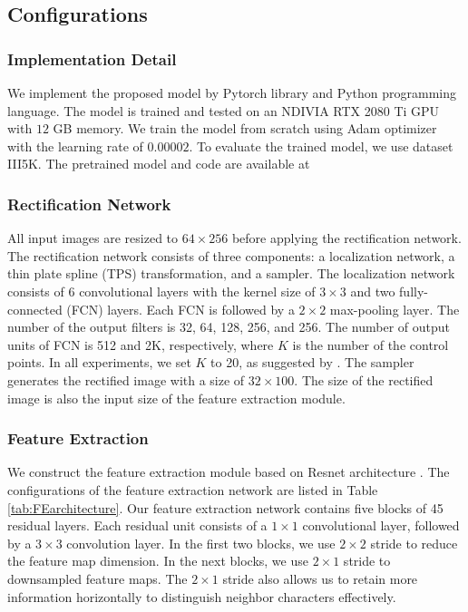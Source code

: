 \subsection{Configurations}
\subsubsection{Implementation Detail}
We implement the proposed model by Pytorch library and Python programming language. The model is trained and tested on an NDIVIA RTX 2080 Ti GPU with $12$ GB memory. We train the model from scratch using Adam optimizer with the learning rate of $0.00002$. To evaluate the trained model, we use dataset III5K. The pretrained model and code are available at \cite{sourcecode}

\subsubsection{Rectification Network} 
All input images are resized to $64 \times 256$ before applying the rectification network. The rectification network consists of three components: a localization network, a thin plate spline (TPS) transformation,  and a sampler. The localization network consists of 6 convolutional layers with the kernel size of $3 \times 3$ and two fully-connected (FCN) layers. Each FCN is followed by a $2 \times 2$ max-pooling layer. The number of the output filters is 32, 64, 128, 256, and 256. The number of output units of FCN is 512 and 2K, respectively, where $K$ is the number of the control points. In all experiments, we set $K$ to 20, as suggested by \cite{shi2018aster}. The sampler generates the rectified image with a size of $32 \times 100$. The size of the rectified image is also the input size of the feature extraction module. 

\subsubsection{Feature Extraction} We construct the feature extraction module based on Resnet architecture \cite{he2016deep}. The configurations of the feature extraction network are listed in Table \ref{tab:FEarchitecture}. Our feature extraction network contains five blocks of 45 residual layers. Each residual unit consists of a $1 \times 1$ convolutional layer, followed by a $3 \times 3$ convolution layer. In the first two blocks, we use $2 \times 2$ stride to reduce the feature map dimension. In the next blocks, we use $2 \times 1$ stride to downsampled feature maps. The $2 \times 1$ stride also allows us to retain more information horizontally to distinguish neighbor characters effectively.

